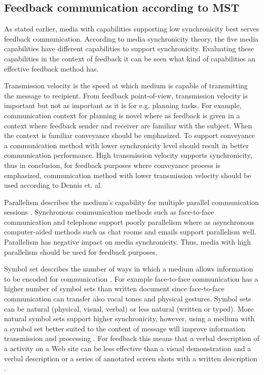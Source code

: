 \documentclass[conference]{IEEEtran}
\begin{document}
\subsection{Feedback communication according to MST}

As stated earlier, media with capabilities supporting low synchronicity best serves feedback communication. According to media synchronicity theory, the five media capabilities have different capabilities to support synchronicity. Evaluating these capabilities in the context of feedback it can be seen what kind of capabilities an effective feedback method has.

Transmission velocity is the speed at which medium is capable of transmitting the message to recipient. From feedback point-of-view, transmission velocity is important but not as important as it is for e.g. planning tasks. For example, communication context for planning is novel where as feedback is given in a context where feedback sender and receiver are familiar with the subject. When the context is familiar conveyance should be emphasized. To support conveyance a communication method with lower synchronicity level should result in better communication performance. High transmission velocity supports synchronicity, thus in conclusion, for feedback purposes where conveyance process is emphasized, communication method with lower transmission velocity should be used according to Dennis et. al. \cite{2008dennis}

Parallelism describes the medium's capability for multiple parallel communication sessions \cite{2008dennis}. Synchronous communication methods such as face-to-face communication and telephone support poorly parallelism where as asynchronous computer-aided methods such as chat rooms and emails support parallelism well. Parallelism has negative impact on media synchronicity. Thus, media with high parallelism should be used for feedback purposes. \cite{2008dennis}

Symbol set describes the number of ways in which a medium allows information to be encoded for communication \cite{2008dennis}. For example face-to-face communication has a higher number of symbol sets than written document since face-to-face communication can transfer also vocal tones and physical gestures. Symbol sets can be natural (physical, visual, verbal) or less natural (written or typed). More natural symbol sets support higher synchronicity, however, using a medium with a symbol set better suited to the content of message will improve information transmission and processing \cite{2008dennis}. For feedback this means that a verbal description of a activity on a Web site can be less effective than a visual demonstration and a verbal description or a series of annotated screen shots with a written description \cite{2008dennis}.
\end{document}
